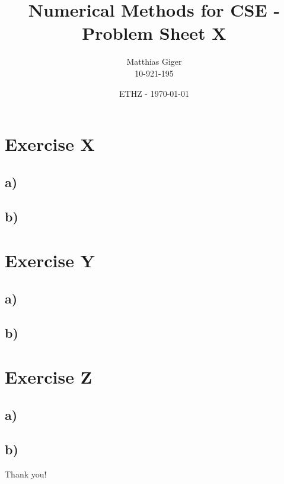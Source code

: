 \documentclass[10pt,a4paper]{article}
\author{Matthias Giger\\\footnotesize 10-921-195}
\title{\textbf{\huge Numerical Methods for CSE - Problem Sheet X}}
\date{ETHZ - \today}
\begin{document}
\maketitle

\section*{Exercise X}

\subsection*{a)}


\subsection*{b)}


\section*{Exercise Y}

\subsection*{a)}


\subsection*{b)}


\section*{Exercise Z}

\subsection*{a)}


\subsection*{b)}



\begin{center}Thank {\recycle} you!\end{center}
\end{document}
